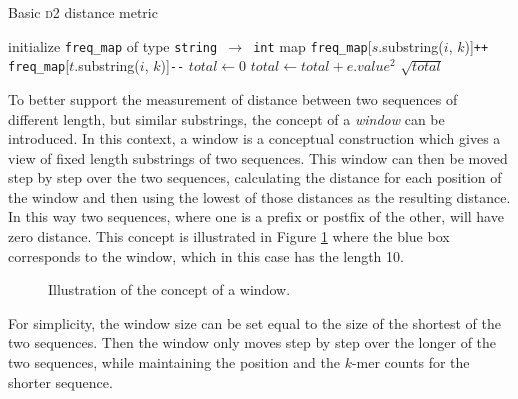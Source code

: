 \begin{algorithm}
  \caption{Basic \textsc{d2} distance metric}
  \label{alg:d2_basic}
  \begin{algorithmic}[1]
    \Statex
      \State initialize \texttt{freq\_map} of type \texttt{string $\to$ int} map
        \State \texttt{freq\_map}[$s$.substring($i$, $k$)]\texttt{++}
      \EndFor
        \State \texttt{freq\_map}[$t$.substring($i$, $k$)]\texttt{-{}-}
      \EndFor
      \State $total \gets 0$
        \State $total \gets total + e.value^2$
      \EndFor
      \State \Return $\sqrt{total}$
    \EndFunction
  \end{algorithmic}
\end{algorithm}

To better support the measurement of distance between two sequences of
different length, but similar substrings, the concept of a \emph{window} can be
introduced. In this context, a window is a conceptual construction which gives
a view of fixed length substrings of two sequences. This window can then be
moved step by step over the two sequences, calculating the distance for each
position of the window and then using the lowest of those distances as the
resulting distance. In this way two sequences, where one is a prefix or postfix
of the other, will have zero distance. This concept is illustrated in Figure
\ref{fig:d2_window_concept} where the blue box corresponds to the window, which
in this case has the length 10.

\begin{figure}[H]
\centering
{}
\caption{Illustration of the concept of a window.}
\label{fig:d2_window_concept}
\end{figure}

For simplicity, the window size can be set equal to the size of the shortest of
the two sequences. Then the window only moves step by step over the longer of
the two sequences, while maintaining the position and the $k$-mer counts for
the shorter sequence.

